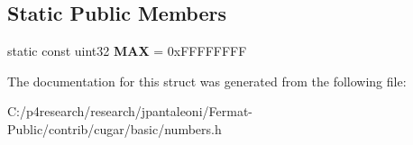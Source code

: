 \subsection*{Static Public Members}
\begin{DoxyCompactItemize}
\item 
\mbox{\label{structcugar_1_1_l_c_g__random_aef93318f9c9bcfc29c5d9db4c82b740d}} 
static const uint32 {\bfseries M\+AX} = 0x\+F\+F\+F\+F\+F\+F\+FF
\end{DoxyCompactItemize}


The documentation for this struct was generated from the following file\+:\begin{DoxyCompactItemize}
\item 
C\+:/p4research/research/jpantaleoni/\+Fermat-\/\+Public/contrib/cugar/basic/numbers.\+h\end{DoxyCompactItemize}
